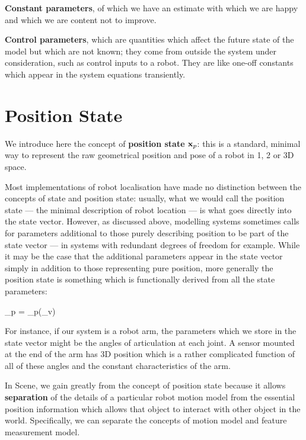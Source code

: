 \documentclass{article}
\begin{document}
\item {\bf Constant parameters}, of which we have an estimate with
which we are happy and which we are content not to improve.

\item {\bf Control parameters}, which are quantities which
affect the future state of the model but which are not known; they
come from outside the system under consideration, such as control
inputs to a robot. They are like one-off constants which appear in the
system equations transiently.
\ee


\section{Position State}

We introduce here the concept of {\bf position state} ${{\bf x}}_p$: this
is a standard, minimal way to represent the raw geometrical position
and pose of a robot in 1, 2 or 3D space.

Most implementations of robot localisation have made no distinction
between the concepts of state and position state: usually, what we
would call the position state --- the minimal description of robot
location --- is what goes directly into the state vector.  However, as
discussed above, modelling systems sometimes calls for parameters
additional to those purely describing position to be part of the state
vector --- in systems with redundant degrees of freedom for example.
While it may be the case that the additional parameters appear in the
state vector simply in addition to those representing pure position,
more generally the position state is something which is functionally
derived from all the state parameters:

\beq
\vecx_p = \vecx_p(\vecx_v)
\eeq

For instance, if our system is a robot arm, the parameters which we
store in the state vector might be the angles of articulation at each
joint. A sensor mounted at the end of the arm has 3D position
which is a rather complicated function of all of these angles and the
constant characteristics of the arm.


In Scene, we gain greatly from the concept of position state because
it allows {\bf separation} of the details of a particular robot motion
model from the essential position information which allows that object
to interact with other object in the world. Specifically, we can
separate the concepts of motion model and feature measurement model.
\end{document}

